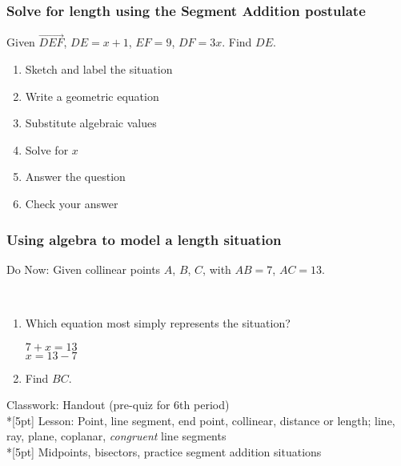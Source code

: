 \frame
{
  \frametitle{Solve for length using the Segment Addition postulate}
  
  Given $\overrightarrow{DEF}$, $DE=x+1$, $EF=9$, $DF=3x$. Find ${DE}$.\\[0.5in]
  \begin{center}   
  \end{center}
\begin{enumerate}
    \item<2-> Sketch and label the situation\\
    \item<2-> Write a geometric equation\\
    \item<2-> Substitute algebraic values\\
    \item<2-> Solve for $x$\\
    \item<2-> Answer the question\\
    \item<2-> Check your answer
  \end{enumerate}
}

\frame
{
  \frametitle{Using algebra to model a length situation}

  Do Now: Given collinear points $A$, $B$, $C$, with $AB=7$, $AC=13$.
       \\ \vspace{0.2cm}
    \begin{enumerate}
      \item Which equation most simply represents the situation?
      \begin{multicols}{2}
        $7 + x = 13$ \\
        $x = 13 - 7$
      \end{multicols}
    \item Find $BC$.
    \end{enumerate}
    Classwork: Handout (pre-quiz for 6th period) \\*[5pt]
  Lesson: Point, line segment, end point, collinear, distance or length; line, ray, plane, coplanar, \emph{congruent} line segments \\*[5pt]
  Midpoints, bisectors, practice segment addition situations
  }

